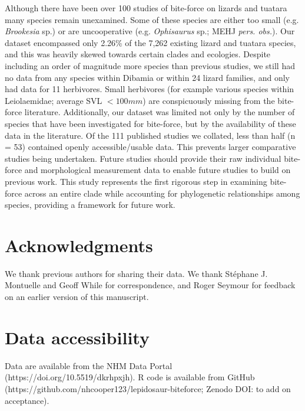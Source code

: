 \documentclass[a4paper, 12pt]{article}
\begin{document}
Although there have been over 100 studies of bite-force on lizards and tuatara \cite{lappin2014reliable} many species remain unexamined. 
Some of these species are either too small (e.g. \textit{Brookesia} sp.) or are uncooperative (e.g. \textit{Ophisaurus} sp.; MEHJ \textit{pers. obs.}). 
Our dataset encompassed only 2.26\% of the 7,262 existing lizard and tuatara species\cite{uetz2020reptile}, and this was heavily skewed towards certain clades and ecologies. 
Despite including an order of magnitude more species than previous studies, we still had no data from any species within Dibamia or within 24 lizard families, and only had data for 11 herbivores. 
Small herbivores (for example various species within Leiolaemidae; average SVL $< 100 mm$\cite{espinoza2004recurrent}) are conspicuously missing from the bite-force literature. 
Additionally, our dataset was limited not only by the number of species that have been investigated for bite-force, but by the availability of these data in the literature. Of the 111 published studies we collated, less than half (n = 53) contained openly accessible/usable data. 
This prevents larger comparative studies being undertaken. 
Future studies should provide their raw individual bite-force and morphological measurement data to enable future studies to build on previous work. 
This study represents the first rigorous step in examining bite-force across an entire clade while accounting for phylogenetic relationships among species, providing a framework for future work. 


\section{Acknowledgments}
We thank previous authors for sharing their data. We thank  St\'ephane J. Montuelle and Geoff While for correspondence, and Roger Seymour for feedback on an earlier version of this manuscript.

\section{Data accessibility}\label{data-code-and-materials}
Data are available from the NHM Data Portal (https://doi.org/10.5519/dkrhpxjh\cite{lepidosaurdata}). 
R code is available from GitHub (https://github.com/nhcooper123/lepidosaur-biteforce; Zenodo DOI: to add on acceptance).
\end{document}
